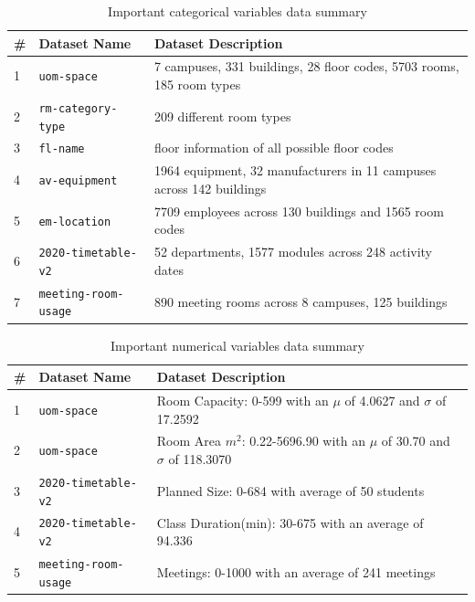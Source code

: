 \begin{table}[H]
\centering
\begin{tabular}{|l|l|l|}
\hline
\# & \textbf{Dataset Name} & \textbf{Dataset Description}                                           \\ \hline
1  & \texttt{uom-space}             &  7 campuses, 331 buildings, 28 floor codes, 5703 rooms, 185 room types             \\ \hline
2  & \texttt{rm-category-type}      & 209 different room types               \\ \hline
3  & \texttt{fl-name}               & floor information of all possible floor codes              \\ \hline
4  & \texttt{av-equipment}         & 1964 equipment, 32 manufacturers in 11 campuses across 142 buildings        \\ \hline
5  & \texttt{em-location}           & 7709 employees across 130 buildings and 1565 room codes                       \\ \hline
6  & \texttt{2020-timetable-v2}     & 52 departments, 1577 modules across 248 activity dates \\ \hline
7  & \texttt{meeting-room-usage}    & 890 meeting rooms across 8 campuses, 125 buildings                                   \\ \hline
\end{tabular}
\caption{Important categorical variables data summary}
\end{table}

\begin{table}[H]
\centering
\begin{tabular}{|l|l|l|}
\hline
\# & \textbf{Dataset Name} & \textbf{Dataset Description}                                           \\ \hline
1  & \texttt{uom-space}             &  Room Capacity: 0-599 with an $\mu$ of 4.0627 and $\sigma$ of 17.2592             \\ \hline
2  & \texttt{uom-space}             &  Room Area $m^2$: 0.22-5696.90 with an $\mu$ of 30.70 and $\sigma$ of 118.3070               \\ \hline                    
3  & \texttt{2020-timetable-v2}     & Planned Size: 0-684 with average of 50 students \\ \hline
4  & \texttt{2020-timetable-v2}     & Class Duration(min): 30-675 with an average of 94.336 \\ \hline
5  & \texttt{meeting-room-usage}    & Meetings: 0-1000 with an average of 241 meetings                                   \\ \hline
\end{tabular}
\caption{Important numerical variables data summary}
\end{table}

